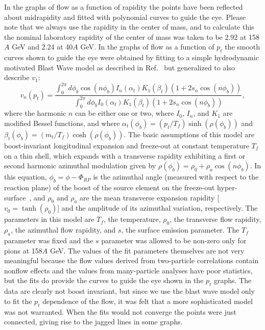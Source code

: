 \documentclass[aps,prc,superscriptaddress,showpacs,floatfix,nofootinbib]{revtex4}
\begin{document}
In the graphs of flow as a function of rapidity the points have been
reflected about midrapidity and fitted with polynomial curves to guide
the eye.  Please note that we always use the rapidity in the center of
mass, and to calculate this the nominal laboratory rapidity of the
center of mass was taken to be 2.92 at 158$A$ GeV and 2.24 at 40$A$
GeV.  In the graphs of flow as a function of $p_t$ the smooth curves
shown to guide the eye were obtained by fitting to a simple
hydrodynamic motivated Blast Wave model as described in
Ref.~\cite{Snellings:2001,pasi2} but generalized to also describe
$v_1$:
\begin{equation}
  v_n(p_t)=
  \frac{  \int_0^{2\pi} d\phi_b
    \cos(n \phi_b)
    I_n(\alpha_t) K_1 (\beta_t)
    (1+2 s_n \cos(n\phi_b))}
  {  \int_0^{2\pi} d\phi_b
    I_0(\alpha_t) K_1 (\beta_t)
    (1+2 s_n \cos(n\phi_b))},
  \label{modblastwave}
\end{equation}
where the harmonic $n$ can be either one or two, where $I_0$, $I_n$,
and $K_1$ are modified Bessel functions, and where
$\alpha_t(\phi_b)=(p_t/T_f)\sinh(\rho(\phi_b))$ and
$\beta_t(\phi_b)=(m_t/T_f)\cosh(\rho(\phi_b))$.  The basic assumptions
of this model are boost-invariant longitudinal expansion and
freeze-out at constant temperature $T_f$ on a thin shell, which
expands with a transverse rapidity exhibiting a first or second
harmonic azimuthal modulation given by $\rho(\phi_b)=\rho_0 +\rho_a
\cos(n \phi_b)$.  In this equation, $\phi_b = \phi - \Phi_{RP}$ is the
azimuthal angle (measured with respect to the reaction plane) of the
boost of the source element on the freeze-out
hyper-surface~\cite{pasi2}, and $\rho_0$ and $\rho_a$ are the mean
transverse expansion rapidity [$v_0 = \tanh(\rho_0)$] and the
amplitude of its azimuthal variation, respectively. The parameters in
this model are $T_f$, the temperature, $\rho_0$, the transverse flow
rapidity, $\rho_a$, the azimuthal flow rapidity, and $s$, the surface
emission parameter. The $T_f$ parameter was fixed and the $s$
parameter was allowed to be non-zero only for pions at 158$A$ GeV. The
values of the fit parameters themselves are not very meaningful
because the flow values derived from two-particle correlations contain
nonflow effects and the values from many-particle analyses have poor
statistics, but the fits do provide the curves to guide the eye shown
in the $p_t$ graphs. The data are clearly not boost invariant, but
since we use the blast wave model only to fit the $p_t$ dependence of
the flow, it was felt that a more sophisticated model was not
warranted.  When the fits would not converge the points were just
connected, giving rise to the jagged lines in some graphs.
\end{document}

